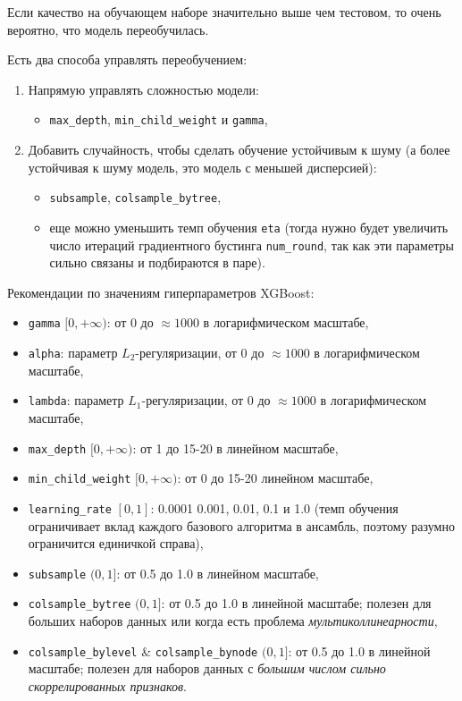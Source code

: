 \documentclass[%
	11pt,
	a4paper,
	utf8,
		]{article}
\begin{document}
Если качество на обучающем наборе значительно выше чем тестовом, то очень вероятно, что модель переобучилась.

Есть два способа управлять переобучением:
\begin{enumerate}
	\item Напрямую управлять сложностью модели:
	\begin{itemize}
		\item \verb|max_depth|, \verb|min_child_weight| и \verb|gamma|,
	\end{itemize}
	\item Добавить случайность, чтобы сделать обучение устойчивым к шуму (а более устойчивая к шуму модель, это модель с меньшей дисперсией):
	\begin{itemize}
		\item \verb|subsample|, \verb|colsample_bytree|,
		
		\item еще можно уменьшить темп обучения \verb|eta| (тогда нужно будет увеличить число итераций градиентного бустинга \verb|num_round|, так как эти параметры сильно связаны и подбираются в паре).
	\end{itemize}
\end{enumerate}

Рекомендации по значениям гиперпараметров XGBoost:
\begin{itemize}
	\item \verb|gamma| $ [0, +\infty) $: от 0 до $ \approx 1000  $ в логарифмическом масштабе,
	
	\item \verb|alpha|: параметр $ L_2 $-регуляризации, от 0 до $ \approx 1000  $ в логарифмическом масштабе,
	
	\item \verb|lambda|: параметр $ L_1 $-регуляризации, от 0 до $ \approx 1000  $ в логарифмическом масштабе,
	
	\item \verb|max_depth| $ [0, +\infty) $: от 1 до 15-20 в линейном масштабе,
	
	\item \verb|min_child_weight| $ [0, +\infty) $: от 0 до 15-20 линейном масштабе,
	
	\item \verb|learning_rate| $ [0, 1] $: 0.0001 0.001, 0.01, 0.1 и 1.0 (темп обучения ограничивает вклад каждого базового алгоритма в ансамбль, поэтому разумно ограничится единичкой справа),
	
	\item \verb|subsample| $ (0, 1] $: от 0.5 до 1.0 в линейном масштабе,
	
	\item \verb|colsample_bytree| $ (0, 1] $: от 0.5 до 1.0 в линейной масштабе; полезен для больших наборов данных или когда есть проблема \emph{мультиколлинеарности},
	
	\item \verb|colsample_bylevel| \& \verb|colsample_bynode| $ (0, 1] $: от 0.5 до 1.0 в линейной масштабе; полезен для наборов данных с \emph{большим числом сильно скоррелированных признаков}.
\end{itemize}
\end{document}
